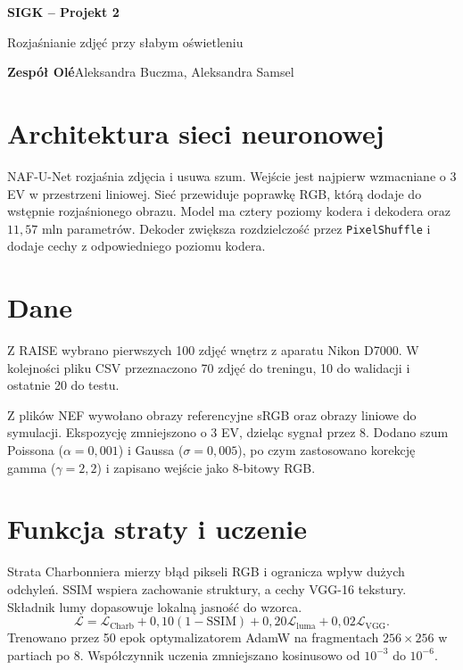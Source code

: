 \documentclass[11pt,a4paper]{article}
\begin{document}
\begin{center}
  {\LARGE\bfseries SIGK -- Projekt 2}\par
  \vspace{4pt}
  {\large Rozjaśnianie zdjęć przy słabym oświetleniu}\par
  \vspace{4pt}
  \textbf{Zespół Olé}\quad Aleksandra Buczma, Aleksandra Samsel
\end{center}

\begingroup\small
\setlength{\intextsep}{3pt}
\captionsetup{skip=3pt}
\section*{Architektura sieci neuronowej}
NAF-U-Net rozjaśnia zdjęcia i usuwa szum. Wejście jest najpierw wzmacniane
o 3 EV w przestrzeni liniowej. Sieć przewiduje poprawkę RGB, którą dodaje
do wstępnie rozjaśnionego obrazu. Model ma cztery poziomy kodera i dekodera
oraz \(11{,}57\) mln parametrów. Dekoder zwiększa rozdzielczość przez
\texttt{PixelShuffle} i dodaje cechy z odpowiedniego poziomu kodera.

\section*{Dane}
Z RAISE wybrano pierwszych 100 zdjęć wnętrz z aparatu Nikon D7000.
W kolejności pliku CSV przeznaczono 70 zdjęć do treningu, 10 do walidacji
i ostatnie 20 do testu.

Z plików NEF wywołano obrazy referencyjne sRGB oraz obrazy liniowe do symulacji.
Ekspozycję zmniejszono o 3 EV, dzieląc sygnał przez 8. Dodano szum Poissona
(\(\alpha=0{,}001\)) i Gaussa (\(\sigma=0{,}005\)), po czym zastosowano
korekcję gamma (\(\gamma=2{,}2\)) i zapisano wejście jako 8-bitowy RGB.

\section*{Funkcja straty i uczenie}
Strata Charbonniera mierzy błąd pikseli RGB i ogranicza wpływ dużych odchyleń.
SSIM wspiera zachowanie struktury, a cechy VGG-16 tekstury. Składnik lumy
dopasowuje lokalną jasność do wzorca.
\[
\mathcal{L}=\mathcal{L}_{\mathrm{Charb}}+
0{,}10(1-\mathrm{SSIM})+0{,}20\mathcal{L}_{\mathrm{luma}}+
0{,}02\mathcal{L}_{\mathrm{VGG}}.
\]
Trenowano przez 50 epok optymalizatorem AdamW na fragmentach
\(256\times256\) w partiach po 8. Współczynnik uczenia zmniejszano
kosinusowo od \(10^{-3}\) do \(10^{-6}\).
\end{document}
